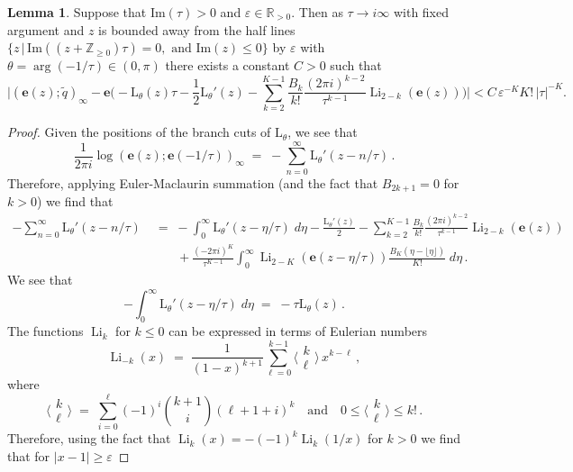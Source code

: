 \documentclass[12pt,reqno]{amsart}
\theoremstyle{definition}
\newtheorem{lemma}[theorem]{Lemma}
\def\BZ{\mathbb Z}
\def\BR{\mathbb R}
\def\Im{\mathrm{Im}}
\def\be{\begin{equation}}
\def\ee{\end{equation}}
\def\e{\mathbf e}
\renewcommand{\=}{\;=\;}
\newcommand{\tq}{\widetilde q}
\newcommand{\Li}{\operatorname{Li}}
\begin{document}
\begin{lemma}\label{lem:asymp.qpoch}
Suppose that $\Im(\tau)>0$ and $\varepsilon\in\BR_{>0}$. Then as $\tau\rightarrow i\infty$ with fixed argument and $z$ is bounded away from the half lines $\{z\,|\,\Im((z+\BZ_{\geq0})\tau)=0,\text{ and }\Im(z)\leq0\}$ by $\varepsilon$ with $\theta=\arg(-1/\tau)\in(0,\pi)$ there exists a constant $C>0$ such that
\be
    \Big|(\e(z);\tq)_{\infty}
    -
    \e\Big(-\mathrm{L}_{\theta}(z)\tau
    -
    \frac{1}{2}\mathrm{L}_{\theta}'(z)
    -
    \sum_{k=2}^{K-1}\frac{B_k}{k!}\frac{(2\pi i)^{k-2}}{\tau^{k-1}}\Li_{2-k}(\e(z))\Big)
    \Big|
    <
    C\,\varepsilon^{-K}K!\,|\tau|^{-K}.
\ee
\end{lemma}
\begin{proof}
Given the positions of the branch cuts of $\mathrm{L}_{\theta}$, we see that
\be
    \frac{1}{2\pi i}\log(\e(z);\e(-1/\tau))_{\infty}
    \=
    -\sum_{n=0}^{\infty}\mathrm{L}_{\theta}'(z-n/\tau)\,.
\ee
Therefore, applying Euler-Maclaurin summation (and the fact that $B_{2k+1}=0$ for $k>0$) we find that
\be
\begin{aligned}
    -\sum_{n=0}^{\infty}\mathrm{L}_{\theta}'(z-n/\tau)
    &\=
    -\int_{0}^{\infty}\mathrm{L}_{\theta}'(z-\eta/\tau)\;d\eta-\frac{\mathrm{L}_{\theta}'(z)}{2}-\sum_{k=2}^{K-1}\frac{B_{k}}{k!}\frac{(2\pi i)^{k-2}}{\tau^{k-1}}\Li_{2-k}(\e(z))\\
    &\qquad+\frac{(-2\pi i)^{K}}{\tau^{K-1}}\int_{0}^{\infty}\Li_{2-K}(\e(z-\eta/\tau))\frac{B_{K}(\eta-\lfloor \eta\rfloor)}{K!}\;d\eta\,.
\end{aligned}
\ee
We see that
\be
    -\int_{0}^{\infty}\mathrm{L}_{\theta}'(z-\eta/\tau)\;d\eta
    \=
    -\tau \mathrm{L}_{\theta}(z)\,.
\ee
The functions $\Li_{k}$ for $k\leq0$ can be expressed in terms of Eulerian numbers
\be
  \Li_{-k}(x)
  \=
  \frac{1}{(1-x)^{k+1}}\sum_{\ell=0}^{k-1}\Big\langle\!\!\begin{array}{c}k\\\ell\end{array}\!\!\Big\rangle\, x^{k-\ell}\,,
\ee
where
\be
  \Big\langle\!\!\begin{array}{c}k\\\ell\end{array}\!\!\Big\rangle
  \=
  \sum_{i=0}^{\ell}(-1)^{i}\binom{k+1}{i}(\ell+1+i)^{k}
  \quad\text{and}\quad
  0\leq
  \Big\langle\!\!\begin{array}{c}k\\\ell\end{array}\!\!\Big\rangle
  \leq
  k!\,.
\ee
Therefore, using the fact that $\Li_{k}(x)=-(-1)^{k}\Li_{k}(1/x)$ for $k>0$ we find that for $|x-1|\geq\varepsilon$

\end{proof}
\end{document}
